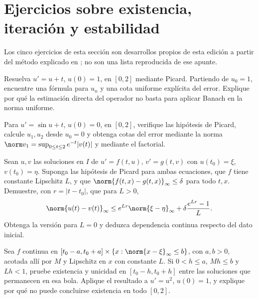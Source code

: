 \section{Ejercicios sobre existencia, iteración y estabilidad}
Los cinco ejercicios de esta sección son desarrollos propios de esta edición a partir del método explicado en \cite{max-picard}; no son una lista reproducida de ese apunte.

\begin{ejercicio}\label{ej:ampl-picard-1}
Resuelva $u'=u+t$, $u(0)=1$, en $[0,2]$ mediante Picard. Partiendo de $u_0=1$, encuentre una fórmula para $u_n$ y una cota uniforme explícita del error. Explique por qué la estimación directa del operador no basta para aplicar Banach en la norma uniforme.
\end{ejercicio}


\begin{ejercicio}\label{ej:ampl-picard-2}
Para $u'=\sin u+t$, $u(0)=0$, en $[0,2]$, verifique las hipótesis de Picard, calcule $u_1,u_2$ desde $u_0=0$ y obtenga cotas del error mediante la norma $\norm v_1=\sup_{0\le t\le2}e^{-t}|v(t)|$ y mediante el factorial.
\end{ejercicio}


\begin{ejercicio}\label{ej:ampl-picard-3}
Sean $u,v$ las soluciones en $I$ de $u'=f(t,u)$, $v'=g(t,v)$ con $u(t_0)=\xi$, $v(t_0)=\eta$. Suponga las hipótesis de Picard para ambas ecuaciones, que $f$ tiene constante Lipschitz $L$, y que $\norm{f(t,x)-g(t,x)}_\infty\le\delta$ para todo $t,x$. Demuestre, con $r=|t-t_0|$, que para $L>0$,
\[
 \norm{u(t)-v(t)}_\infty
 \le e^{Lr}\norm{\xi-\eta}_\infty
       +\delta\frac{e^{Lr}-1}{L}.
\]
Obtenga la versión para $L=0$ y deduzca dependencia continua respecto del dato inicial.
\end{ejercicio}


\begin{ejercicio}\label{ej:ampl-picard-4}
Sea $f$ continua en $[t_0-a,t_0+a]\times\{x:\norm{x-\xi}_\infty\le b\}$, con $a,b>0$, acotada allí por $M$ y Lipschitz en $x$ con constante $L$. Si $0<h\le a$, $Mh\le b$ y $Lh<1$, pruebe existencia y unicidad en $[t_0-h,t_0+h]$ entre las soluciones que permanecen en esa bola. Aplique el resultado a $u'=u^2$, $u(0)=1$, y explique por qué no puede concluirse existencia en todo $[0,2]$.
\end{ejercicio}


